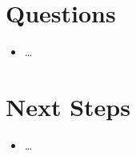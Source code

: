 \documentclass[11pt]{article}
\begin{document}
\section*{Questions}
\begin{itemize}
  \item …
\end{itemize}

\section*{Next Steps}
\begin{itemize}
  \item …
\end{itemize}
\end{document}

